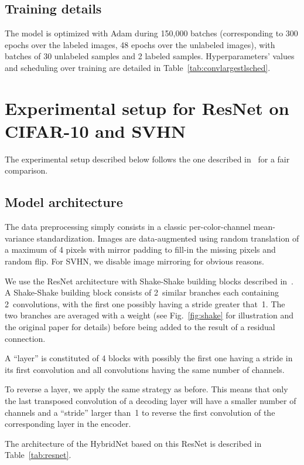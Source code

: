 \documentclass[runningheads]{llncs}
\begin{document}
\subsection{Training details}

The model is optimized with Adam during 150,000 batches (corresponding to 300 epochs over the labeled images, 48 epochs over the unlabeled images), with batches of 30 unlabeled samples and 2 labeled samples.
Hyperparameters' values and scheduling over training are detailed in Table~\ref{tab:convlargestlsched}.


\section{Experimental setup for ResNet on CIFAR-10 and SVHN}

The experimental setup described below follows the one described in~\cite{Tarvainen2017} for a fair comparison.

\subsection{Model architecture}

The data preprocessing simply consists in a classic per-color-channel mean-variance standardization. Images are data-augmented using random translation of a maximum of 4 pixels with mirror padding to fill-in the missing pixels and random flip. For SVHN, we disable image mirroring for obvious reasons.

We use the ResNet architecture with Shake-Shake building blocks described in~\cite{Gastaldi2017}. A Shake-Shake building block consists of 2~similar branches each containing 2~convolutions, with the first one possibly having a stride greater that~1. The two branches are averaged with a weight  (see Fig.~\ref{fig:shake} for illustration and the original paper for details) before being added to the result of a residual connection.

A ``layer'' is constituted of 4 blocks with possibly the first one having a stride in its first convolution and all convolutions having the same number of channels.

To reverse a layer, we apply the same strategy as before. This means that only the last transposed convolution of a decoding layer will have a smaller number of channels and a ``stride'' larger than~1 to reverse the first convolution of the corresponding layer in the encoder.

The architecture of the HybridNet based on this ResNet is described in Table~\ref{tab:resnet}.
\end{document}
